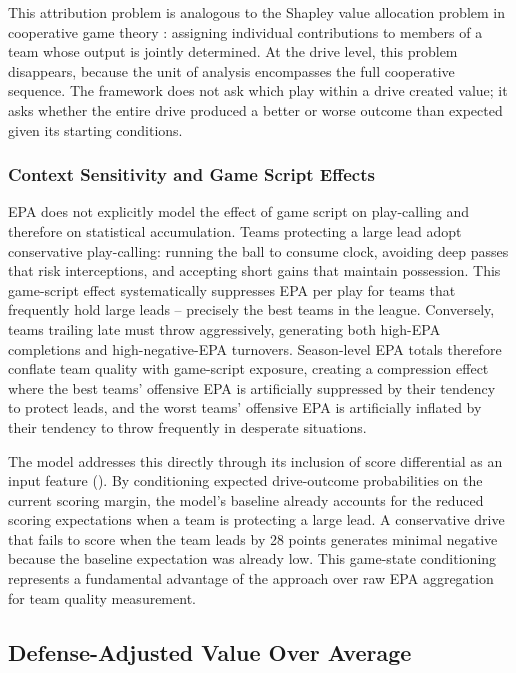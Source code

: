 This attribution problem is analogous to the Shapley value allocation problem in cooperative game theory \parencite{lundberg2017shap}: assigning individual contributions to members of a team whose output is jointly determined. At the drive level, this problem disappears, because the unit of analysis encompasses the full cooperative sequence. The \gds{} framework does not ask which play within a drive created value; it asks whether the entire drive produced a better or worse outcome than expected given its starting conditions.

\subsubsection{Context Sensitivity and Game Script Effects}

EPA does not explicitly model the effect of game script on play-calling and therefore on statistical accumulation. Teams protecting a large lead adopt conservative play-calling: running the ball to consume clock, avoiding deep passes that risk interceptions, and accepting short gains that maintain possession. This game-script effect systematically suppresses EPA per play for teams that frequently hold large leads  -- precisely the best teams in the league. Conversely, teams trailing late must throw aggressively, generating both high-EPA completions and high-negative-EPA turnovers. Season-level EPA totals therefore conflate team quality with game-script exposure, creating a compression effect where the best teams' offensive EPA is artificially suppressed by their tendency to protect leads, and the worst teams' offensive EPA is artificially inflated by their tendency to throw frequently in desperate situations.

The \xscore{} model addresses this directly through its inclusion of score differential as an input feature (). By conditioning expected drive-outcome probabilities on the current scoring margin, the model's baseline already accounts for the reduced scoring expectations when a team is protecting a large lead. A conservative drive that fails to score when the team leads by 28 points generates minimal negative \xvoa{} because the baseline expectation was already low. This game-state conditioning represents a fundamental advantage of the \gds{} approach over raw EPA aggregation for team quality measurement.

\subsection{Defense-Adjusted Value Over Average}
\label{sec:dvoa}

